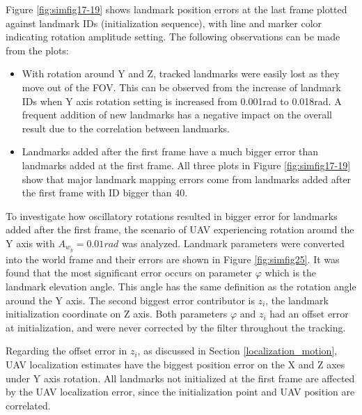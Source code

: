 Figure \ref{fig:simfig17-19} shows landmark position errors at
the last frame plotted against landmark IDs (initialization
sequence), with line and marker color indicating rotation amplitude
setting. The following observations can be made from the plots:

\begin{itemize}
  \item With rotation around Y and Z, tracked landmarks were easily lost
  as they move out of the FOV. This can be observed from the increase of
  landmark IDs when Y axis rotation setting is increased from 0.001rad to
  0.018rad. A frequent addition of new landmarks has a negative impact on
  the overall result due to the correlation between landmarks.
  \item Landmarks added after the first frame have a much bigger error
  than landmarks added at the first frame. All three plots in Figure
  \ref{fig:simfig17-19} show that major landmark mapping errors come
  from landmarks added after the first frame with ID bigger than 40.
\end{itemize}
\FloatBarrier

To investigate how oscillatory rotations resulted in bigger error for
landmarks added after the first frame, the scenario of UAV
experiencing rotation around the Y axis with $A_{w_y}=0.01rad$ was
analyzed. Landmark parameters were converted into the world frame and
their errors are shown in Figure \ref{fig:simfig25}. It was found that
the most significant error occurs on parameter $\varphi$ which is the
landmark elevation angle. This angle has the same definition as the
rotation angle around the Y axis. The second biggest error contributor
is $z_i$, the landmark initialization coordinate on Z axis. Both
parameters $\varphi$ and $z_i$ had an offset error at initialization, and
were never corrected by the filter throughout the tracking.

Regarding the offset error in $z_i$, as discussed in Section
\ref{localization_motion}, UAV localization estimates have the biggest
position error on the X and Z axes under Y axis rotation. All landmarks
not initialized at the first frame are affected by the UAV
localization error, since the initialization point and UAV position
are correlated.


